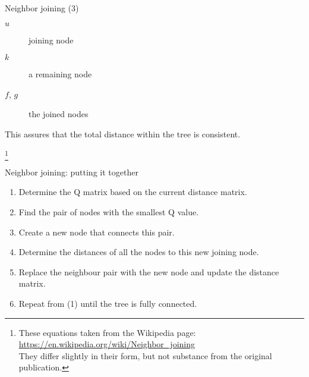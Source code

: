 \documentclass[pdf]{beamer}
\newcommand\blfootnote[1]{%
  \begingroup  %
  \renewcommand\thefootnote{}\footnote{#1}%
  \addtocounter{footnote}{-1}  %
  \endgroup
}
\begin{document}
{\begin{frame}{Neighbor joining (3)}
  \begin{description}
  \item[$u$] joining node
  \item[$k$] a remaining node
  \item[$f$, $g$] the joined nodes
  \end{description}
  
  This assures that the total distance within the tree is consistent.

  \blfootnote{These equations taken from the Wikipedia page:\\
    \url{https://en.wikipedia.org/wiki/Neighbor_joining}\\
    They differ slightly in their form, but not substance from the original publication.}
\end{frame}

\begin{frame}{Neighbor joining: putting it together}
  \begin{enumerate}
  \item Determine the Q matrix based on the current distance matrix.
  \item Find the pair of nodes with the smallest Q value.
  \item Create a new node that connects this pair.
  \item Determine the distances of all the nodes to this new joining node.
  \item Replace the neighbour pair with the new node and update the distance
    matrix.
  \item Repeat from (1) until the tree is fully connected.
  \end{enumerate}
  
\end{frame}

}
\end{document}
